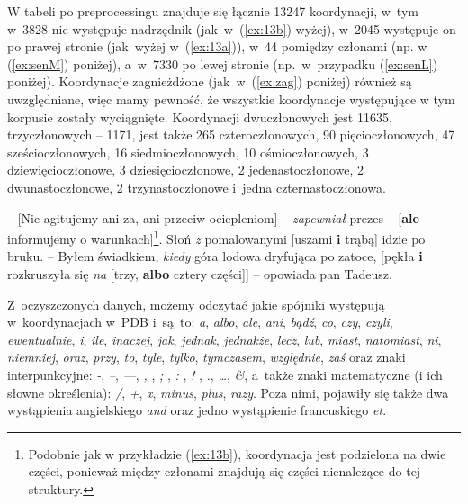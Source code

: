 \documentclass[licencjacka]{pracamgr_Kogni}
\begin{document}
    W tabeli po preprocessingu znajduje się łącznie 13247 koordynacji, w~tym w~3828 nie występuje nadrzędnik (jak~w~(\ref{ex:13b}) wyżej), w~2045 występuje on po prawej stronie (jak~wyżej w~(\ref{ex:13a})), w~44 pomiędzy członami (np. w (\ref{ex:senM}) poniżej), a~w~7330 po lewej stronie (np.~w~przypadku (\ref{ex:senL}) poniżej).
    Koordynacje zagnieżdżone (jak~w~(\ref{ex:zag}) poniżej) również są uwzględniane, więc mamy pewność, że wszystkie koordynacje występujące w tym korpusie zostały wyciągnięte.
    Koordynacji dwuczłonowych jest 11635, trzyczłonowych -- 1171, jest także 265 czteroczłonowych, 90 pięcioczłonowych, 47 sześcioczłonowych, 16 siedmioczłonowych, 10 ośmioczłonowych, 3 dziewięcioczłonowe, 3 dziesięcioczłonowe, 2 jedenastoczłonowe, 2 dwunastoczłonowe, 2 trzynastoczłonowe i~jedna czternastoczłonowa.
    \begin{exe}
        \ex
        {– [Nie agitujemy ani za, ani przeciw ociepleniom] – \textit{zapewniał} prezes – [\textbf{ale} informujemy o warunkach]\footnote{Podobnie jak w przykładzie (\ref{ex:13b}), koordynacja jest podzielona na dwie części, ponieważ między członami znajdują się części nienależące do tej struktury.}.
            \label{ex:senM}}
        \ex
        Słoń \textit{z} pomalowanymi [uszami \textbf{i} trąbą] idzie po bruku.
            \label{ex:senL}
        \ex
        – Byłem świadkiem, \textit{kiedy} góra lodowa dryfująca po zatoce, [pękła \textbf{i} rozkruszyła się \textit{na} [trzy, \textbf{albo} cztery części]] – opowiada pan Tadeusz.
            \label{ex:zag}
    \end{exe}

    Z~oczyszczonych danych, możemy odczytać jakie spójniki występują w~koordynacjach w~PDB i~są~to: \textit{a}, \textit{albo}, \textit{ale}, \textit{ani}, \textit{bądź}, \textit{co}, \textit{czy}, \textit{czyli}, \textit{ewentualnie}, \textit{i}, \textit{ile}, \textit{inaczej}, \textit{jak}, \textit{jednak}, \textit{jednakże}, \textit{lecz}, \textit{lub}, \textit{miast},  \textit{natomiast}, \textit{ni}, \textit{niemniej}, \textit{oraz}, \textit{przy}, \textit{to}, \textit{tyle}, \textit{tylko}, \textit{tymczasem}, \textit{względnie}, \textit{zaś} oraz znaki interpunkcyjne: \textit{-}, \textit{--}, \textit{---}, \textit{, }, \textit{; }, \textit{: }, \textit{! }, \textit{.}, \textit{…}, \textit{\&}, a~także znaki matematyczne (i ich słowne określenia): \textit{/}, \textit{+}, \textit{x}, \textit{minus}, \textit{plus}, \textit{razy}.
    Poza nimi, pojawiły się także dwa wystąpienia angielskiego \textit{and} oraz jedno wystąpienie francuskiego \textit{et}.
\end{document}
